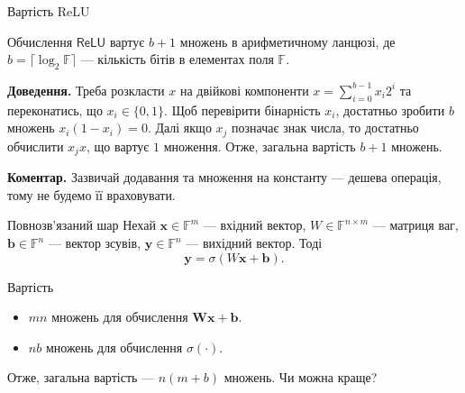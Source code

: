 \documentclass{zkdl-presentation-template}
\begin{document}
    \begin{frame}{Вартість ReLU}
        \begin{lemma}
            Обчислення $\mathsf{ReLU}$ вартує $b+1$ множень в арифметичному
            ланцюзі, де $b = \lceil \log_2 \mathbb{F}\rceil$ --- кількість бітів в
            елементах поля $\mathbb{F}$.
        \end{lemma}

        \textbf{Доведення.} Треба розкласти $x$ на двійкові
        компоненти $x = \sum_{i=0}^{b-1} x_i 2^i$ та переконатись, що 
        $x_i \in \{0,1\}$. Щоб перевірити бінарність $x_i$, достатньо 
        зробити $b$ множень $x_i(1-x_i)=0$. Далі якщо $x_j$ позначає 
        знак числа, то достатньо обчислити $x_jx$, що вартує $1$
        множення. Отже, загальна вартість $b+1$ множень.

        \textcolor{gray!50!black}{\textbf{Коментар.}} Зазвичай додавання та
        множення на константу --- дешева операція, тому не будемо її
        враховувати.
    \end{frame}

    \begin{frame}{Повнозв'язаний шар}
        Нехай $\boldsymbol{x} \in \mathbb{F}^m$ --- вхідний вектор, $W \in
        \mathbb{F}^{n \times m}$ --- матриця ваг, $\boldsymbol{b} \in \mathbb{F}^n$ ---
        вектор зсувів, $\boldsymbol{y} \in \mathbb{F}^n$ --- вихідний вектор. Тоді
        \begin{equation*}
            \boldsymbol{y} = \sigma(W \boldsymbol{x} + \boldsymbol{b}).
        \end{equation*}

        \begin{block}{Вартість}
            \begin{itemize}
                \item $mn$ множень для обчислення $\boldsymbol{W}\boldsymbol{x}+\boldsymbol{b}$.
                \item $nb$ множень для обчислення $\sigma(\cdot)$.
            \end{itemize}
            Отже, загальна вартість --- $n(m+b)$ множень. Чи можна краще?
        \end{block}
    \end{frame}
\end{document}
